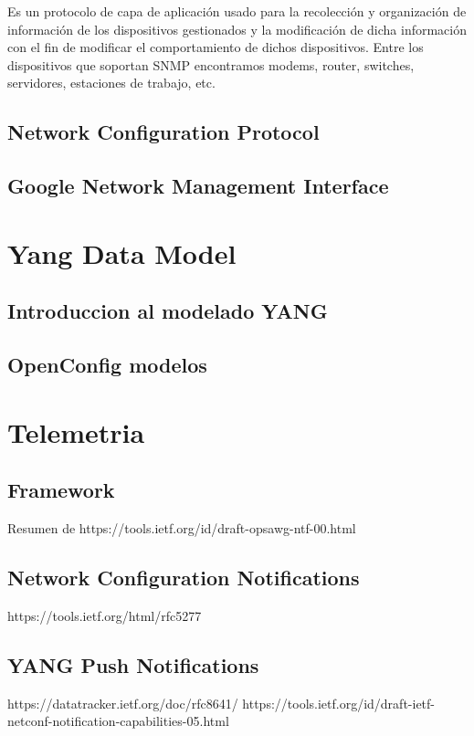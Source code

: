Es un protocolo de capa de aplicación usado para la recolección y organización de información de los 
dispositivos gestionados y la modificación de dicha información con el fin de modificar el comportamiento 
de dichos dispositivos. Entre los dispositivos que soportan SNMP encontramos modems, router, switches, 
servidores, estaciones de trabajo, etc.

\subsection{Network Configuration Protocol\label{sec:NETCONF}}

\subsection{Google Network Management Interface\label{sec:gNMI}}

\section{Yang Data Model}

\subsection{Introduccion al modelado YANG}

\subsection{OpenConfig modelos}

\section{Telemetria}

\subsection{Framework}

Resumen de
https://tools.ietf.org/id/draft-opsawg-ntf-00.html

\subsection{Network Configuration Notifications\label{sec:NETCONFNot}}

https://tools.ietf.org/html/rfc5277

\subsection{YANG Push Notifications\label{sec:YANGNot}}

https://datatracker.ietf.org/doc/rfc8641/
https://tools.ietf.org/id/draft-ietf-netconf-notification-capabilities-05.html

